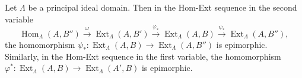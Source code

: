 Let $\Lambda$ be a principal ideal domain. Then in the Hom-Ext sequence in the second variable
$$
\operatorname{Hom}_\Lambda(A, B'') \xrightarrow{\omega} \operatorname{Ext}_\Lambda(A, B') \xrightarrow{\varphi_*} \operatorname{Ext}_\Lambda(A, B) \xrightarrow{\psi_*} \operatorname{Ext}_\Lambda(A, B''),
$$
the homomorphism $\psi_* : \operatorname{Ext}_\Lambda(A, B) \to \operatorname{Ext}_\Lambda(A, B'')$ is epimorphic. Similarly, in the Hom-Ext sequence in the first variable, the homomorphism $\varphi^* : \operatorname{Ext}_\Lambda(A, B) \to \operatorname{Ext}_\Lambda(A', B)$ is epimorphic.
